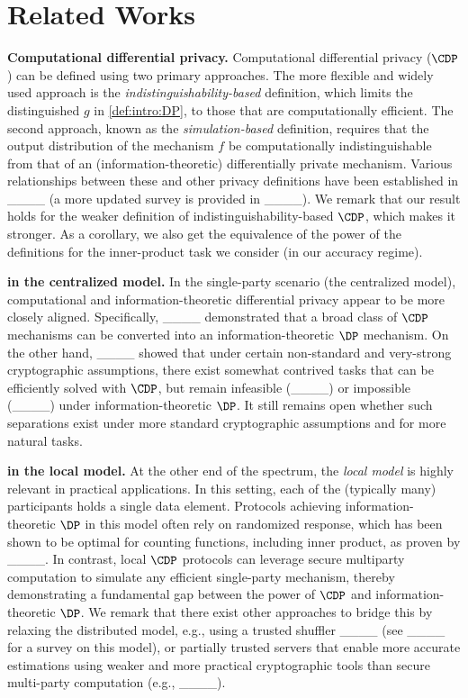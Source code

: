 \section{Related Works}
\label{sec:related-works}

\textbf{Computational differential privacy.} Computational differential privacy ($\CDP$) can be defined using two primary approaches.
The more flexible and widely used approach is the \emph{indistinguishability-based} definition, which limits the distinguished $g$ in \cref{def:intro:DP}, to those that are computationally efficient. The second approach, known as the \emph{simulation-based} definition, requires that the output distribution of the mechanism $f$ be computationally indistinguishable from that of an (information-theoretic) differentially private mechanism. Various relationships between these and other privacy definitions have been established in ____ (a more updated survey is provided in ____). We remark that our result holds for the weaker definition of indistinguishability-based $\CDP$, which makes it stronger. As a corollary, we also get the equivalence of the power of the definitions for the inner-product task we consider (in our accuracy regime).

\textbf{\CDP in the centralized model.} In the single-party scenario (\ie the centralized model), computational and information-theoretic differential privacy appear to be more closely aligned. Specifically, ____ demonstrated that a broad class of $\CDP$ mechanisms can be converted into an information-theoretic $\DP$ mechanism. On the other hand, ____ showed that under certain non-standard and very-strong cryptographic assumptions, there exist somewhat contrived tasks that can be efficiently solved with $\CDP$, but remain infeasible (____) or impossible (____) under information-theoretic $\DP$. It still remains open whether such separations exist under more standard cryptographic assumptions and for more natural tasks.

\textbf{\CDP in the local model.} At the other end of the spectrum, the \emph{local model} is highly relevant in practical applications. In this setting, each of the (typically many) participants holds a single data element. Protocols achieving information-theoretic $\DP$ in this model often rely on randomized response, which has been shown to be optimal for counting functions, including inner product, as proven by ____. In contrast, local $\CDP$ protocols can leverage secure multiparty computation to simulate any efficient single-party mechanism, thereby demonstrating a fundamental gap between the power of $\CDP$ and information-theoretic $\DP$. We remark that there exist other approaches to bridge this by relaxing the distributed model, e.g., using a trusted shuffler ____ (see ____ for a survey on this model), or partially trusted servers that enable more accurate estimations using weaker and more practical cryptographic tools than secure multi-party computation (e.g., ____).

